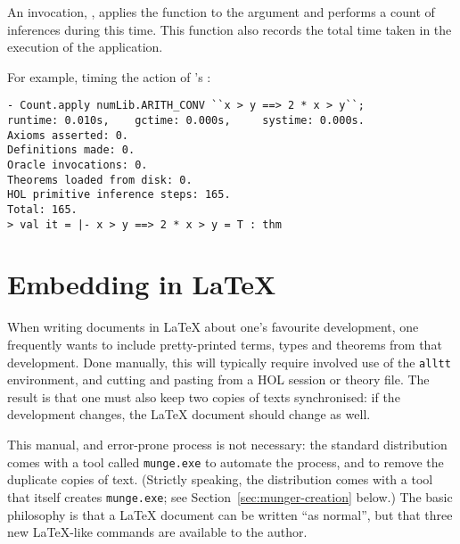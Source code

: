 An invocation, , applies the function  to
the argument  and performs a count of inferences during this
time.  This function also records the total time taken in the
execution of the application.

For example, timing the action of 's :

\setcounter{sessioncount}{1}
\begin{session}
\begin{verbatim}
- Count.apply numLib.ARITH_CONV ``x > y ==> 2 * x > y``;
runtime: 0.010s,    gctime: 0.000s,     systime: 0.000s.
Axioms asserted: 0.
Definitions made: 0.
Oracle invocations: 0.
Theorems loaded from disk: 0.
HOL primitive inference steps: 165.
Total: 165.
> val it = |- x > y ==> 2 * x > y = T : thm
\end{verbatim}
\end{session}



\section{\texorpdfstring{Embedding \HOL{} in \LaTeX{}}{Embedding HOL in \LaTeX{}}}

%
When writing documents in \LaTeX{} about one's favourite \HOL{} development, one frequently wants to include pretty-printed terms, types and theorems from that development.
%
Done manually, this will typically require involved use of the \texttt{alltt} environment, and cutting and pasting from a HOL session or theory file.
%
The result is that one must also keep two copies of \HOL{} texts synchronised: if the \HOL{} development changes, the \LaTeX{} document should change as well.

\newcommand{\munge}{\texttt{munge.exe}}
%
This manual, and error-prone process is not necessary: the standard \HOL{} distribution comes with a tool called \munge{} to automate the process, and to remove the duplicate copies of \HOL{} text.
%
(Strictly speaking, the distribution comes with a tool that itself creates \munge{}; see Section~\ref{sec:munger-creation} below.)
%
The basic philosophy is that a \LaTeX{} document can be written ``as normal'', but that three new \LaTeX{}-like commands are available to the author.

